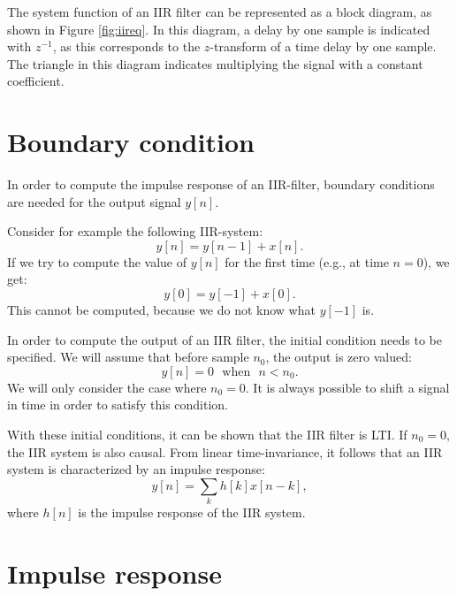 The system function of an IIR filter can be represented as a block
diagram, as shown in Figure \ref{fig:iireq}. In this diagram, a delay
by one sample is indicated with $z^{-1}$, as this corresponds to the
$z$-transform of a time delay by one sample. The triangle in this
diagram indicates multiplying the signal with a constant coefficient.

    \section{Boundary condition}

    In order to compute the impulse response of an IIR-filter, boundary
    conditions are needed for the output signal $y[n]$.

    Consider for example the following IIR-system:
    \begin{equation}
        y[n] = y[n-1] + x[n].
    \end{equation}
    If we try to compute the value of $y[n]$ for the first time (e.g., at time $n=0$), we get:
    \begin{equation}
        y[0] = y[-1] + x[0].
    \end{equation}
    This cannot be computed, because we do not know what $y[-1]$ is.

    In order to compute the output of an IIR filter, the initial condition
    needs to be specified. We will assume that before sample $n_0$, the
    output is zero valued:
    \begin{equation}
        y[n] = 0 ~~~ \mathrm{when}  ~~~n<n_0.
    \end{equation}
    We will only consider the case where $n_0=0$. It is always possible to
    shift a signal in time in order to satisfy this condition.

    With these initial conditions, it can be shown that the IIR filter is
    LTI. If $n_0=0$, the IIR system is also causal. From linear
    time-invariance, it follows that an IIR system is characterized by an
    impulse response:
    \begin{equation}
        y[n] = \sum_{k} h[k]x[n-k],
    \end{equation}
    where $h[n]$ is the impulse response of the IIR system.
\fi

\section{Impulse response}

